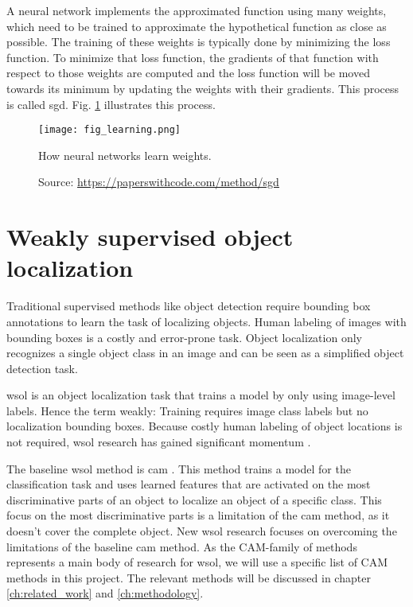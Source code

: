 A neural network implements the approximated function using many weights, which need to be trained to approximate the hypothetical function as close as possible. The training of these weights is typically done by minimizing the loss function. To minimize that loss function, the gradients of that function with respect to those weights are computed and the loss function will be moved towards its minimum by updating the weights with their gradients. This process is called \acrfull{sgd}. Fig. \ref{fig:learning} illustrates this process.
\begin{figure}[ht]
    \begin{center}       
    \texttt{[image: fig\_learning.png]}
    \caption[How neural networks learn weights]{How neural networks learn weights.}
    \caption*{Source: \href{https://paperswithcode.com/method/sgd}{https://paperswithcode.com/method/sgd}}
    \label{fig:learning}
    \end{center}
\end{figure}

\section{Weakly supervised object localization}
Traditional supervised methods like object detection require bounding box annotations to learn the task of localizing objects. Human labeling of images with bounding boxes is a costly and error-prone task. Object localization only recognizes a single object class in an image and can be seen as a simplified object detection task. 

\acrshort{wsol} is an object localization task that trains a model by only using image-level labels. Hence the term weakly: Training requires image class labels but no localization bounding boxes. Because costly human labeling of object locations is not required, \acrshort{wsol} research has gained significant momentum \cite{zhou2016cvpr, selvaraju2017grad, chattopadhay2018grad, wang2021minmaxcam, wang2020score, choe2020evaluating}.

The baseline \acrshort{wsol} method is \acrfull{cam} \cite{zhou2016cvpr}. This method trains a model for the classification task and uses learned features that are activated on the most discriminative parts of an object to localize an object of a specific class. This focus on the most discriminative parts is a limitation of the \acrshort{cam} method, as it doesn't cover the complete object. New \acrshort{wsol} research \cite{selvaraju2017grad, chattopadhay2018grad, wang2021minmaxcam, wang2020score, choe2020evaluating} focuses on overcoming the limitations of the baseline \acrshort{cam} method. As the CAM-family of methods represents a main body of research for \acrlong{wsol}, we will use a specific list of CAM methods in this project. The relevant methods will be discussed in chapter \ref{ch:related_work} and \ref{ch:methodology}. 

